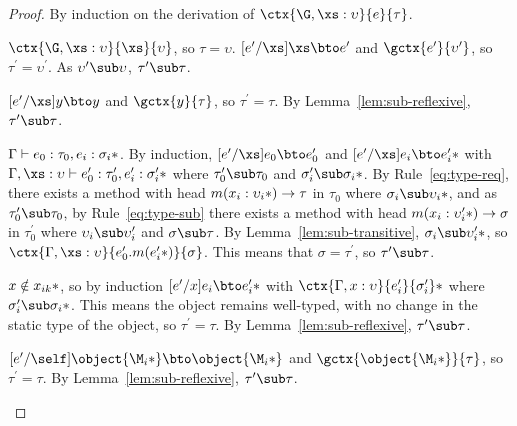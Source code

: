 \begin{theorem}[Preservation]
\begin{lemma}
    \begin{proof}
      By induction on the derivation of $\ctx{\G, \xs : \upsilon}{e}{\tau}$.

      \begin{match}
        $\ctx{\G, \xs : \upsilon}{\xs}{\upsilon}$, so $\tau = \upsilon$.
        $[e^\prime/\xs]\xs \bto e^\prime$ and $\gctx{e^\prime}{\upsilon^\prime}$,
        so $\tau^\prime = \upsilon^\prime$.  As $\upsilon^\prime \sub \upsilon$,
        $\tau^\prime \sub \tau$.

        $[e^\prime/\xs]y \bto y$ and $\gctx{y}{\tau}$, so $\tau^\prime = \tau$.
        By Lemma~\ref{lem:sub-reflexive}, $\tau^\prime \sub \tau$.

        $\Gamma \vdash e_0 : \tau_0, \*e_i : \sigma_i*$.  By induction,
        $[e^\prime/\xs]e_0 \bto e^\prime_0$ and $\*[e^\prime/\xs]e_i \bto
        e^\prime_i*$ with $\Gamma, \xs : \upsilon \vdash e^\prime_0 :
        \tau_0^\prime, \*e^\prime_i : \sigma_i^\prime*$ where $\tau_0^\prime \sub
        \tau_0$ and $\*\sigma_i^\prime \sub \sigma_i*$.  By
        Rule~\ref{eq:type-req}, there exists a method with head $m(\*x_i :
        \upsilon_i*) \to \tau$ in $\tau_0$ where $\*\sigma_i \sub \upsilon_i*$,
        and as $\tau_0^\prime \sub \tau_0$, by Rule~\ref{eq:type-sub} there exists
        a method with head $m(\*x_i : \upsilon_i^\prime*) \to \sigma$ in
        $\tau_0^\prime$ where $\upsilon_i \sub \upsilon_i^\prime$ and
        $\sigma \sub \tau$.  By Lemma~\ref{lem:sub-transitive}, $\*\sigma_i
        \sub \upsilon_i^\prime*$, so $\ctx{\Gamma, \xs :
        \upsilon}{e_0^\prime.m(\*e_i^\prime*)}{\sigma}$.  This means that $\sigma
        = \tau^\prime$, so $\tau^\prime \sub \tau$.

        $x \notin \*x_{ik}*$, so by induction $\*[e^\prime/x]e_i \bto e_i^\prime*$
        with $\*\ctx{\Gamma, x : \upsilon}{e_i^\prime}{\sigma_i^\prime}*$ where
        $\*\sigma_i^\prime \sub \sigma_i*$.  This means the object remains
        well-typed, with no change in the static type of the object, so
        $\tau^\prime = \tau$.  By Lemma~\ref{lem:sub-reflexive}, $\tau^\prime
        \sub \tau$.

        $[e^\prime/\self]\object{\*\M_i*} \bto \object{\*\M_i*}$ and
        $\gctx{\object{\*\M_i*}}{\tau}$, so $\tau^\prime = \tau$.  By
        Lemma~\ref{lem:sub-reflexive}, $\tau^\prime \sub \tau$.
      \end{match}
    \end{proof}
  \end{lemma}


\end{theorem}
